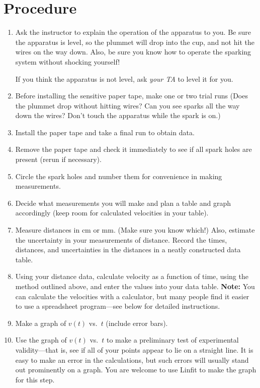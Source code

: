 \section*{Procedure}
\begin{enumerate}
\item Ask the instructor to explain the operation of the apparatus to you.  Be
sure the apparatus is level, so the plummet will drop into the cup, and not hit
the wires on the way down.  Also, be sure you know how to operate the sparking
system without shocking yourself!

If you think the apparatus is not level, ask {\em your TA} to level it
for you.

\item Before installing the sensitive paper tape, make one or two trial runs
(Does the plummet drop without hitting wires?  Can you see sparks all the
way down the wires?  Don't touch the apparatus while the spark is on.)

\item Install the paper tape and take a final run to obtain data.

\item Remove the paper tape and check it immediately to see if all spark holes
are present (rerun if necessary).

\item Circle the spark holes and number them for convenience in making
measurements.

\item Decide what measurements you will make and plan a table and graph
accordingly (keep room for calculated velocities in your table).

\item Measure distances in cm or mm. (Make sure you know which!)  
Also, estimate the uncertainty in your
measurements of distance.  Record the times, distances, and
uncertainties in the distances in a neatly constructed data table.
%
\item Using your distance data, calculate velocity as a function
of time, using the method outlined above, and enter the values
into your data table.  {\bf Note:}  You can calculate
the velocities with a calculator, but many people find it easier to use a
spreadsheet program---see below for detailed instructions.

\item  Make a graph of
$v(t)$ vs.\ $t$ (include error bars).

\item Use the graph of $v(t)$ vs.\ $t$ to make a preliminary test of
experimental validity---that is, see if all of your points appear to
lie on a straight line.  It is easy to make an error in the
calculations, but such errors will usually stand out prominently on
a graph.  You are welcome to use Linfit to make the graph for this
step.

\end{enumerate}

